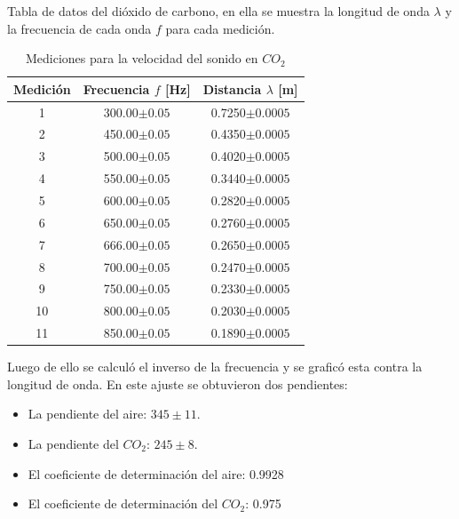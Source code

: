 \documentclass[10pt,a4paper]{article}
\begin{document}
Tabla de datos del dióxido de carbono, en ella se muestra la longitud de onda $\lambda$ y la frecuencia de cada onda $f$ para cada medición.
\begin{table}[H]
  \centering
    \begin{tabular}{|c|c|c|} \hline
    Medición & Frecuencia $f$ [Hz] & Distancia $\lambda$ [m] \\ \hline
    1     & 300.00$\pm 0.05$ & 0.7250$\pm 0.0005$ \\ \hline
    2     & 450.00$\pm 0.05$ & 0.4350$\pm 0.0005$ \\ \hline
    3     & 500.00$\pm 0.05$ & 0.4020$\pm 0.0005$ \\ \hline
    4     & 550.00$\pm 0.05$ & 0.3440$\pm 0.0005$ \\ \hline
    5     & 600.00$\pm 0.05$ & 0.2820$\pm 0.0005$ \\ \hline
    6     & 650.00$\pm 0.05$ & 0.2760$\pm 0.0005$ \\ \hline
    7     & 666.00$\pm 0.05$ & 0.2650$\pm 0.0005$ \\ \hline
    8     & 700.00$\pm 0.05$ & 0.2470$\pm 0.0005$ \\ \hline
    9     & 750.00$\pm 0.05$ & 0.2330$\pm 0.0005$ \\ \hline
    10    & 800.00$\pm 0.05$ & 0.2030$\pm 0.0005$ \\ \hline
    11    & 850.00$\pm 0.05$ & 0.1890$\pm 0.0005$ \\ \hline
    \end{tabular}%
  \caption{Mediciones para la velocidad del sonido en $CO_2$}
\end{table}%

Luego de ello se calculó el inverso de la frecuencia y se graficó esta contra la longitud de onda. En este ajuste se obtuvieron dos pendientes: 

\begin{itemize}
    \item   La pendiente del aire: $345\pm11$.
    \item   La pendiente del $CO_2$: $245\pm8$.
    \item El coeficiente de determinación del aire: 0.9928
    \item El coeficiente de determinación del $CO_2$: 0.975
\end{itemize}
\end{document}
